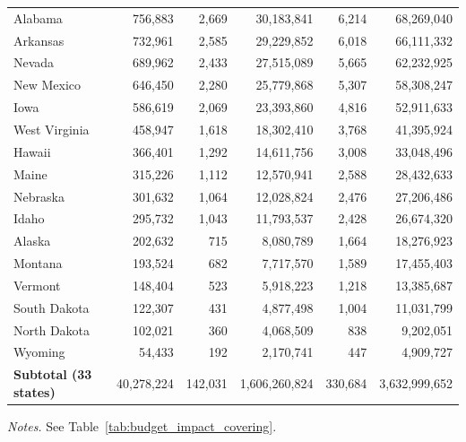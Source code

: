 \begin{landscape}
\begin{table}[!htbp]
\begin{tabular}{@{} l r rr rr @{}}
  Alabama & 756,883 & 2,669 & 30,183,841 & 6,214 & 68,269,040 \\
  Arkansas & 732,961 & 2,585 & 29,229,852 & 6,018 & 66,111,332 \\
  Nevada & 689,962 & 2,433 & 27,515,089 & 5,665 & 62,232,925 \\
  New Mexico & 646,450 & 2,280 & 25,779,868 & 5,307 & 58,308,247 \\
  Iowa & 586,619 & 2,069 & 23,393,860 & 4,816 & 52,911,633 \\
  West Virginia & 458,947 & 1,618 & 18,302,410 & 3,768 & 41,395,924 \\
  Hawaii & 366,401 & 1,292 & 14,611,756 & 3,008 & 33,048,496 \\
  Maine & 315,226 & 1,112 & 12,570,941 & 2,588 & 28,432,633 \\
  Nebraska & 301,632 & 1,064 & 12,028,824 & 2,476 & 27,206,486 \\
  Idaho & 295,732 & 1,043 & 11,793,537 & 2,428 & 26,674,320 \\
  Alaska & 202,632 & 715 & 8,080,789 & 1,664 & 18,276,923 \\
  Montana & 193,524 & 682 & 7,717,570 & 1,589 & 17,455,403 \\
  Vermont & 148,404 & 523 & 5,918,223 & 1,218 & 13,385,687 \\
  South Dakota & 122,307 & 431 & 4,877,498 & 1,004 & 11,031,799 \\
  North Dakota & 102,021 & 360 & 4,068,509 & 838 & 9,202,051 \\
  Wyoming & 54,433 & 192 & 2,170,741 & 447 & 4,909,727 \\
\midrule
  \textbf{Subtotal (33 states)} & 40,278,224 & 142,031 & 1,606,260,824 & 330,684 & 3,632,999,652 \\
\bottomrule
\end{tabular}
\par\vspace{0.4em}
\begin{minipage}{0.95\linewidth}
\scriptsize
\textit{Notes.} See Table~\ref{tab:budget_impact_covering}.
\end{minipage}
\end{table}
\end{landscape}
